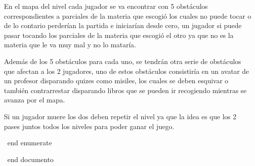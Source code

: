 En el mapa del nivel cada jugador se va encontrar con 5 obstáculos correspondientes a parciales de la materia que escogió los cuales no puede tocar o de lo contario perderían la partida e iniciarían desde cero, un jugador si puede pasar tocando los parciales de la materia que escogió el otro ya que no es la materia que le va muy mal y no lo mataría.

Además de los 5 obstáculos para cada uno, se tendrán otra serie de obstáculos que afectan a los 2 jugadores, uno de estos obstáculos consistiría en un avatar de un profesor disparando quizes como misiles, los cuales se deben esquivar o también contrarrestar disparando libros que se pueden ir recogiendo mientras se avanza por el mapa.

Si un jugador muere los dos deben repetir el nivel ya que la idea es que los 2 pases juntos todos los niveles para poder ganar el juego.
	  \Articulo
	

	\ end { enumerate }
	

	

	\ end { documento }

